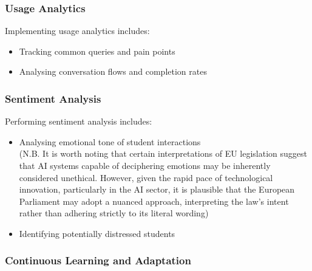 \documentclass[14pt,a4paper]{article}
\begin{document}
\begin{multicols}{2}
\subsubsection{Usage Analytics}
Implementing usage analytics \textit{\parencite[pp. 50-100]{Beasley2023}} includes:
\begin{itemize}
    \item Tracking common queries and pain points
    \item Analysing conversation flows and completion rates
\end{itemize}


\subsubsection*{Sentiment Analysis}
Performing sentiment analysis \textit{\parencite[pp. 50-100]{Liu2023}} includes:
\begin{itemize}
    \item Analysing emotional tone of student interactions\\ (N.B. It is worth noting that certain interpretations of EU legislation suggest that AI systems capable of deciphering emotions may be inherently considered unethical. However, given the rapid pace of technological innovation, particularly in the AI sector, it is plausible that the European Parliament may adopt a nuanced approach, interpreting the law's intent rather than adhering strictly to its literal wording) \textit{\parencite[pp. 150-175]{Dignum2023}}
    \item Identifying potentially distressed students
\end{itemize}

\subsubsection{Continuous Learning and Adaptation}


\end{multicols}
\end{document}
